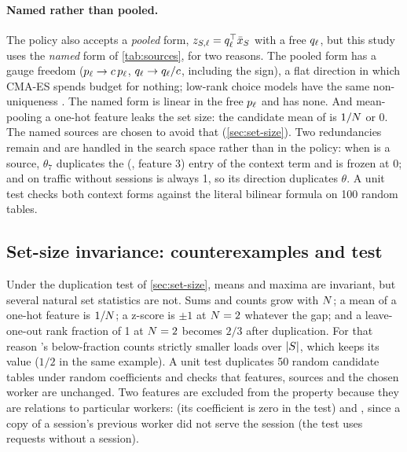 \paragraph{Named rather than pooled.}
The policy also accepts a \emph{pooled} form, $z_{S,\ell} = q_\ell^{\top}\bar{x}_{S}$ with a
free $q_\ell$, but this study uses the \emph{named} form of \cref{tab:sources}, for two reasons.
The pooled form has a gauge freedom ($p_\ell \to c\,p_\ell$, $q_\ell \to q_\ell/c$, including
the sign), a flat direction in which CMA-ES spends budget for nothing; low-rank choice models have
the same non-uniqueness \citep{ko2024attention}. The named form is linear in the free $p_\ell$
and has none. And mean-pooling a one-hot feature leaks the set size: the candidate mean of
 is $1/N$ or 0. The named sources are chosen to avoid that
(\cref{sec:set-size}). Two redundancies remain and are handled in the search space rather than in
the policy: when  is a source, $\theta_7$ duplicates the (, feature 3)
entry of the context term and is frozen at 0; and on traffic without sessions
 is always 1, so its direction duplicates $\theta$. A unit test checks both
context forms against the literal bilinear formula on 100 random tables.

\subsection{Set-size invariance: counterexamples and test}

Under the duplication test of \cref{sec:set-size}, means and maxima are invariant, but several
natural set statistics are not. Sums and counts grow with $N$; a mean of a one-hot feature is
$1/N$; a z-score is $\pm 1$ at $N = 2$ whatever the gap; and a leave-one-out rank fraction of
1 at $N = 2$ becomes $2/3$ after duplication. For that reason 's below-fraction counts
strictly smaller loads over $|S|$, which keeps its value ($1/2$ in the same example). A unit
test duplicates 50 random candidate tables under random  coefficients and checks that
features, sources and the chosen worker are unchanged. Two features are excluded from the property
because they are relations to particular workers:  (its coefficient is zero in
the test) and , since a copy of a session's previous worker did not serve
the session (the test uses requests without a session).

